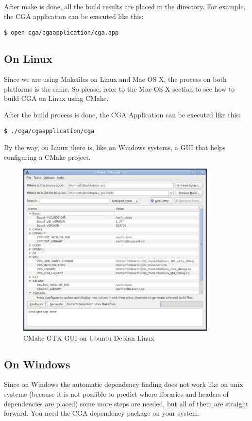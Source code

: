 After make is done, all the build results are placed in the  directory. For example, the CGA application can be executed like this:
\begin{verbatim}
$ open cga/cgaapplication/cga.app
\end{verbatim}

\subsection{On Linux} Since we are using Makefiles on Linux and Mac OS X, the process on both platforms is the same. So please, refer to the Mac OS X section to see how to build CGA on Linux using CMake.

After the build process is done, the CGA Application can be executed like this:
\begin{verbatim}
$ ./cga/cgaapplication/cga
\end{verbatim}

By the way, on Linux there is, like on Windows systems, a GUI that helps configuring a CMake project.

\begin{figure}[ht]
\centering
\includegraphics[width=10cm]{images/cmake_gui_linux}
\caption{CMake GTK GUI on Ubuntu Debian Linux}\label{fig:cmake_gui_linux}
\end{figure}


\subsection{On Windows}
Since on Windows the automatic dependency finding does not work like on unix systems (because it is not possible to predict where libraries and headers of dependencies are placed) some more steps are needed, but all of them are straight forward. You need the CGA dependency package on your system.

